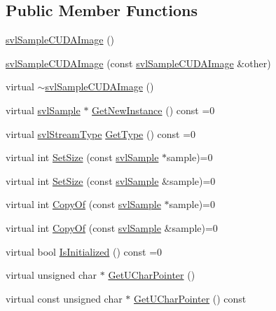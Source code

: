 \subsection*{Public Member Functions}
\begin{DoxyCompactItemize}
\item 
\hyperlink{classsvl_sample_c_u_d_a_image_aaebbc3a6bbe8c16fb8ea14a3c06dd22f}{svl\+Sample\+C\+U\+D\+A\+Image} ()
\item 
\hyperlink{classsvl_sample_c_u_d_a_image_a32086b37f8d2e76098187547a67a58bb}{svl\+Sample\+C\+U\+D\+A\+Image} (const \hyperlink{classsvl_sample_c_u_d_a_image}{svl\+Sample\+C\+U\+D\+A\+Image} \&other)
\item 
virtual \hyperlink{classsvl_sample_c_u_d_a_image_a17ed19c29869601db5c180703ed1fd48}{$\sim$svl\+Sample\+C\+U\+D\+A\+Image} ()
\item 
virtual \hyperlink{classsvl_sample}{svl\+Sample} $\ast$ \hyperlink{classsvl_sample_c_u_d_a_image_a5d7500f6a102241bb5d4722cd6f2d147}{Get\+New\+Instance} () const =0
\item 
virtual \hyperlink{svl_definitions_8h_aa00696d338a58db361335a01fd11e122}{svl\+Stream\+Type} \hyperlink{classsvl_sample_c_u_d_a_image_a9f207b0e1b0ef08d839acbe9fdac64c3}{Get\+Type} () const =0
\item 
virtual int \hyperlink{classsvl_sample_c_u_d_a_image_a492f7179e526a5931c5f0f3c84394677}{Set\+Size} (const \hyperlink{classsvl_sample}{svl\+Sample} $\ast$sample)=0
\item 
virtual int \hyperlink{classsvl_sample_c_u_d_a_image_afb8a430a19e60edf45d68556513b543c}{Set\+Size} (const \hyperlink{classsvl_sample}{svl\+Sample} \&sample)=0
\item 
virtual int \hyperlink{classsvl_sample_c_u_d_a_image_a5d0e37569f6898f1a5595ecf00216e17}{Copy\+Of} (const \hyperlink{classsvl_sample}{svl\+Sample} $\ast$sample)=0
\item 
virtual int \hyperlink{classsvl_sample_c_u_d_a_image_ac4ad6e11ebd3a3c36c09658a1b72d55f}{Copy\+Of} (const \hyperlink{classsvl_sample}{svl\+Sample} \&sample)=0
\item 
virtual bool \hyperlink{classsvl_sample_c_u_d_a_image_ae1c901a8f2628191096b70789ec9253d}{Is\+Initialized} () const =0
\item 
virtual unsigned char $\ast$ \hyperlink{classsvl_sample_c_u_d_a_image_af5920ea9804f0d8e9c0eb6a05d525b5b}{Get\+U\+Char\+Pointer} ()
\item 
virtual const unsigned char $\ast$ \hyperlink{classsvl_sample_c_u_d_a_image_ac934fb0fc4bfa36edd6844b2c1a33c9d}{Get\+U\+Char\+Pointer} () const 

\end{DoxyCompactItemize}
